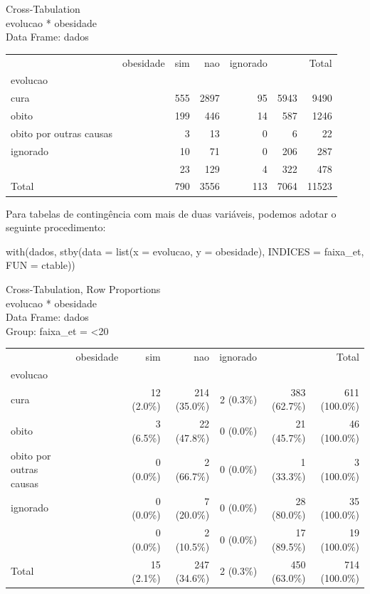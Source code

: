 \documentclass[
  letterpaper,
  DIV=11,
  numbers=noendperiod]{scrreprt}
\newenvironment{Shaded}{\begin{snugshade}}{\end{snugshade}}
\newcommand{\AttributeTok}[1]{\textcolor[rgb]{0.40,0.45,0.13}{#1}}
\newcommand{\FunctionTok}[1]{\textcolor[rgb]{0.28,0.35,0.67}{#1}}
\newcommand{\NormalTok}[1]{\textcolor[rgb]{0.00,0.23,0.31}{#1}}
\begin{document}
Cross-Tabulation\\
evolucao * obesidade\\
Data Frame: dados

\begin{longtable}[]{@{}lrrrrrr@{}}
\toprule()
\endhead
& obesidade & sim & nao & ignorado & & Total \\
evolucao & & & & & & \\
cura & & 555 & 2897 & 95 & 5943 & 9490 \\
obito & & 199 & 446 & 14 & 587 & 1246 \\
obito por outras causas & & 3 & 13 & 0 & 6 & 22 \\
ignorado & & 10 & 71 & 0 & 206 & 287 \\
& & 23 & 129 & 4 & 322 & 478 \\
Total & & 790 & 3556 & 113 & 7064 & 11523 \\
\bottomrule()
\end{longtable}

Para tabelas de contingência com mais de duas variáveis, podemos adotar
o seguinte procedimento:

\begin{Shaded}
\begin{Highlighting}[]
\FunctionTok{with}\NormalTok{(dados, }\FunctionTok{stby}\NormalTok{(}\AttributeTok{data =} \FunctionTok{list}\NormalTok{(}\AttributeTok{x =}\NormalTok{ evolucao, }\AttributeTok{y =}\NormalTok{ obesidade), }
                   \AttributeTok{INDICES =}\NormalTok{ faixa\_et, }\AttributeTok{FUN =}\NormalTok{ ctable))}
\end{Highlighting}
\end{Shaded}

Cross-Tabulation, Row Proportions\\
evolucao * obesidade\\
Data Frame: dados\\
Group: faixa\_et = \textless20

\begin{longtable}[]{@{}lrrrrrr@{}}
\toprule()
\endhead
& obesidade & sim & nao & ignorado & & Total \\
evolucao & & & & & & \\
cura & & 12 (2.0\%) & 214 (35.0\%) & 2 (0.3\%) & 383 (62.7\%) & 611
(100.0\%) \\
obito & & 3 (6.5\%) & 22 (47.8\%) & 0 (0.0\%) & 21 (45.7\%) & 46
(100.0\%) \\
obito por outras causas & & 0 (0.0\%) & 2 (66.7\%) & 0 (0.0\%) & 1
(33.3\%) & 3 (100.0\%) \\
ignorado & & 0 (0.0\%) & 7 (20.0\%) & 0 (0.0\%) & 28 (80.0\%) & 35
(100.0\%) \\
& & 0 (0.0\%) & 2 (10.5\%) & 0 (0.0\%) & 17 (89.5\%) & 19 (100.0\%) \\
Total & & 15 (2.1\%) & 247 (34.6\%) & 2 (0.3\%) & 450 (63.0\%) & 714
(100.0\%) \\
\bottomrule()
\end{longtable}
\end{document}
